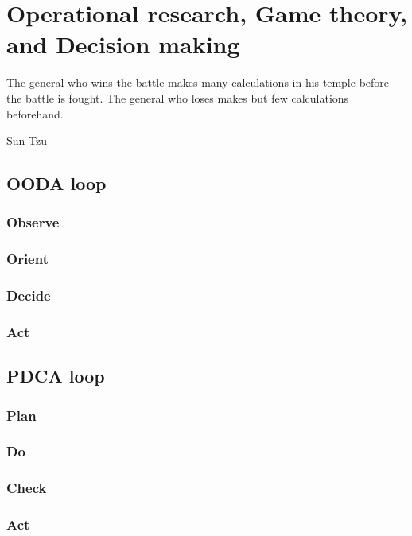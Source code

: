 \chapter{Operational research, Game theory, and Decision making}
  \epigraph{The general who wins the battle makes many calculations in his temple before the battle is fought. The general who loses makes but few calculations beforehand.}{Sun Tzu}
    \section{OODA loop}
      \subsection{Observe}
      \subsection{Orient}
      \subsection{Decide}
      \subsection{Act}
    \section{PDCA loop}
      \subsection{Plan}
      \subsection{Do}
      \subsection{Check}
      \subsection{Act}